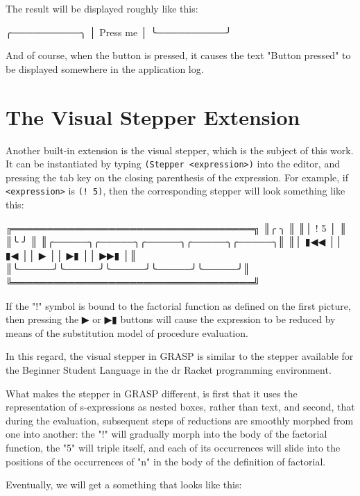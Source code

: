 \documentclass[acmsmall]{acmart}
\newenvironment{Snippet}{\Verbatim[samepage=true]}{\endVerbatim}
\begin{document}
The result will be displayed roughly like this:

\begin{Snippet}
╭──────────╮
│ Press me │
╰──────────╯
\end{Snippet}

And of course, when the button is pressed, it causes the text "Button
pressed" to be displayed somewhere in the application log.

\section{The Visual Stepper Extension}
\label{sec:org02f9edd}

Another built-in extension is the visual stepper, which
is the subject of this work. It can be instantiated by typing
\texttt{(Stepper <expression>)} into the editor, and pressing the tab
key on the closing parenthesis of the expression. For example, 
if \texttt{<expression>} is \texttt{(! 5)}, then the corresponding stepper
will look something like this:

\begin{Snippet}
╔═══════════════════════════════════╗
║╭     ╮                            ║
║│ ! 5 │                            ║
║╰     ╯                            ║
║╭─────╮╭─────╮╭─────╮╭─────╮╭─────╮║
║│ ▮◀◀ ││ ▮◀  ││  ▶  ││  ▶▮ ││ ▶▶▮ │║
║╰─────╯╰─────╯╰─────╯╰─────╯╰─────╯║
╚═══════════════════════════════════╝
\end{Snippet}

If the "!" symbol is bound to the factorial function as defined on the
first picture, then pressing the ▶ or ▶▮ buttons will cause the
expression to be reduced by means of the substitution model of
procedure evaluation.

In this regard, the visual stepper in GRASP is similar to the stepper
available for the Beginner Student Language in the dr Racket
programming environment.

What makes the stepper in GRASP different, is first that it uses the
representation of s-expressions as nested boxes, rather than text, and
second, that during the evaluation, subsequent steps of reductions are
smoothly morphed from one into another: the "!" will gradually morph
into the body of the factorial function, the "5" will triple itself,
and each of its occurrences will slide into the positions of the
occurrences of "n" in the body of the definition of factorial.

Eventually, we will get a something that looks like this:
\end{document}
